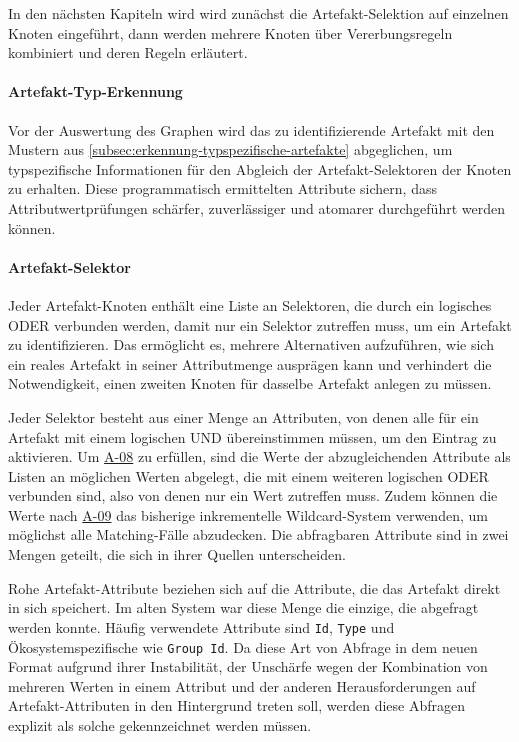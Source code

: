 In den nächsten Kapiteln wird wird zunächst die Artefakt-Selektion auf einzelnen Knoten eingeführt, dann werden mehrere Knoten über Vererbungsregeln kombiniert und deren Regeln erläutert.

\paragraph{Artefakt-Typ-Erkennung}

Vor der Auswertung des Graphen wird das zu identifizierende Artefakt mit den Mustern aus \autoref{subsec:erkennung-typspezifische-artefakte} abgeglichen, um typspezifische Informationen für den Abgleich der Artefakt-Selektoren der Knoten zu erhalten.
Diese programmatisch ermittelten Attribute sichern, dass Attributwertprüfungen schärfer, zuverlässiger und atomarer durchgeführt werden können.

\paragraph{Artefakt-Selektor}

Jeder Artefakt-Knoten enthält eine Liste an Selektoren, die durch ein logisches ODER verbunden werden, damit nur ein Selektor zutreffen muss, um ein Artefakt zu identifizieren.
Das ermöglicht es, mehrere Alternativen aufzuführen, wie sich ein reales Artefakt in seiner Attributmenge ausprägen kann und verhindert die Notwendigkeit, einen zweiten Knoten für dasselbe Artefakt anlegen zu müssen.

Jeder Selektor besteht aus einer Menge an Attributen, von denen alle für ein Artefakt mit einem logischen UND übereinstimmen müssen, um den Eintrag zu aktivieren.
Um \hyperref[subsec:req-multiple-attribute-values]{A-08} zu erfüllen, sind die Werte der abzugleichenden Attribute als Listen an möglichen Werten abgelegt, die mit einem weiteren logischen ODER verbunden sind, also von denen nur ein Wert zutreffen muss.
Zudem können die Werte nach \hyperref[subsec:req-regex-support]{A-09} das bisherige inkrementelle Wildcard-System verwenden, um möglichst alle Matching-Fälle abzudecken.
Die abfragbaren Attribute sind in zwei Mengen geteilt, die sich in ihrer Quellen unterscheiden.

Rohe Artefakt-Attribute beziehen sich auf die Attribute, die das Artefakt direkt in sich speichert.
Im alten System war diese Menge die einzige, die abgefragt werden konnte.
Häufig verwendete Attribute sind \texttt{Id}, \texttt{Type} und Ökosystemspezifische wie \texttt{Group Id}.
Da diese Art von Abfrage in dem neuen Format aufgrund ihrer Instabilität, der Unschärfe wegen der Kombination von mehreren Werten in einem Attribut und der anderen Herausforderungen auf Artefakt-Attributen in den Hintergrund treten soll, werden diese Abfragen explizit als solche gekennzeichnet werden müssen.

